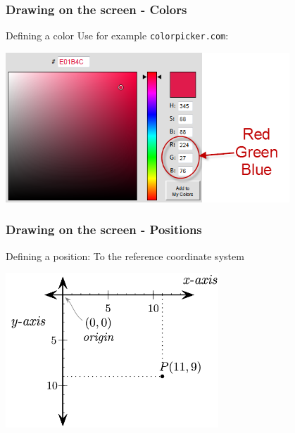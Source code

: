 \documentclass[handout]{beamer}   %
\begin{document}
\begin{frame}
\frametitle{Drawing on the screen - Colors}

Defining a color
\bigskip
\pause
Use for example \textcolor{tg}{\texttt{colorpicker.com}}:
\begin{center}
\includegraphics[width=0.8\textwidth]{img/colorpicker.png}
\end{center}

\end{frame}


\begin{frame}
\frametitle{Drawing on the screen - Positions}

Defining a position:
\bigskip
\pause
To the reference coordinate system
\begin{center}
\includegraphics[width=0.6\textwidth]{img/coordinates.png}
\end{center}
\end{frame}

\end{document}
